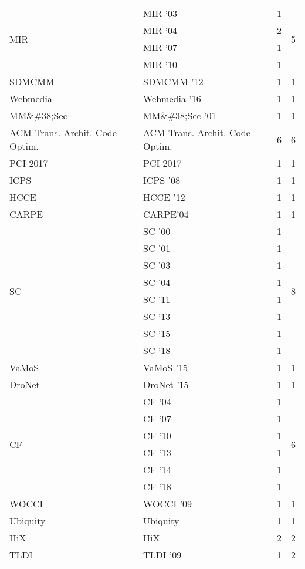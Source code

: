 \begin{table*}[t]
\begin{tabular}{llrr}
\multirow{4}{*}{MIR } & MIR '03 & 1 & \multirow{4}{*}{5}\\
& MIR '04 & 2 &\\
& MIR '07 & 1 &\\
& MIR '10 & 1 &\\
\multirow{1}{*}{SDMCMM } & SDMCMM '12 & 1 & \multirow{1}{*}{1}\\
\multirow{1}{*}{Webmedia } & Webmedia '16 & 1 & \multirow{1}{*}{1}\\
\multirow{1}{*}{MM\&\#38;Sec } & MM\&\#38;Sec '01 & 1 & \multirow{1}{*}{1}\\
\multirow{1}{*}{ACM Trans. Archit. Code Optim.} & ACM Trans. Archit. Code Optim. & 6 & \multirow{1}{*}{6}\\
\multirow{1}{*}{PCI 2017} & PCI 2017 & 1 & \multirow{1}{*}{1}\\
\multirow{1}{*}{ICPS } & ICPS '08 & 1 & \multirow{1}{*}{1}\\
\multirow{1}{*}{HCCE } & HCCE '12 & 1 & \multirow{1}{*}{1}\\
\multirow{1}{*}{CARPE} & CARPE'04 & 1 & \multirow{1}{*}{1}\\
\multirow{8}{*}{SC } & SC '00 & 1 & \multirow{8}{*}{8}\\
& SC '01 & 1 &\\
& SC '03 & 1 &\\
& SC '04 & 1 &\\
& SC '11 & 1 &\\
& SC '13 & 1 &\\
& SC '15 & 1 &\\
& SC '18 & 1 &\\
\multirow{1}{*}{VaMoS } & VaMoS '15 & 1 & \multirow{1}{*}{1}\\
\multirow{1}{*}{DroNet } & DroNet '15 & 1 & \multirow{1}{*}{1}\\
\multirow{6}{*}{CF } & CF '04 & 1 & \multirow{6}{*}{6}\\
& CF '07 & 1 &\\
& CF '10 & 1 &\\
& CF '13 & 1 &\\
& CF '14 & 1 &\\
& CF '18 & 1 &\\
\multirow{1}{*}{WOCCI } & WOCCI '09 & 1 & \multirow{1}{*}{1}\\
\multirow{1}{*}{Ubiquity} & Ubiquity & 1 & \multirow{1}{*}{1}\\
\multirow{1}{*}{IIiX} & IIiX & 2 & \multirow{1}{*}{2}\\
\multirow{2}{*}{TLDI } & TLDI '09 & 1 & \multirow{2}{*}{2}\\

\end{tabular}
\end{table*}
